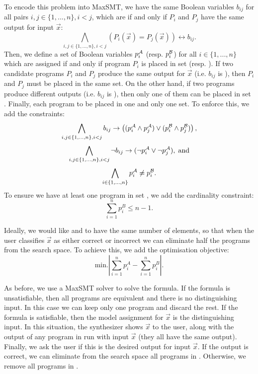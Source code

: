 To encode this problem into \ac{MaxSMT}, we have the same Boolean variables \(b_{ij}\) for all pairs \(i,j \in \{1, ..., n\}, i < j\), which are \true if and only if \(P_i\) and \(P_j\) have the same output for input \(\vec{x}\):
\begin{equation}
    \bigwedge_{i,j \in \{1, ..., n\}, i < j} (P_i(\vec{x}) = P_j(\vec{x})) \leftrightarrow b_{ij}.
\end{equation}
%
Then, we define a set of Boolean variables \(p_i^{\mathcal{A}}\) (resp. \(p_i^{\mathcal{B}}\)) for all \(i\in \{1, ..., n\}\) which are assigned \true if and only if program \(P_i\) is placed in set  (resp. ).
%
If two candidate programs \(P_i\) and \(P_j\) produce the same output for \(\vec{x}\) (i.e. \(b_{ij}\) is \true), then \(P_i\) and \(P_j\) must be placed in the same set. On the other hand, if two programs produce different outputs (i.e. \(b_{ij}\) is \false), then only one of them can be placed in set . Finally, each program to be placed in one and only one set. To enforce this, we add the constraints:
\begin{equation}
    \bigwedge_{i,j \in \{1, ..., n\}, i < j} b_{ij} \rightarrow \left( (p_i^{\mathcal{A}} \wedge p_j^{\mathcal{A}}) \vee (p_i^{\mathcal{B}} \wedge p_j^{\mathcal{B}}) \right),
\end{equation}
%
\begin{equation}
    \bigwedge_{i,j \in \{1, ..., n\}, i < j} \neg b_{ij} \rightarrow (\neg p_i^{\mathcal{A}} \vee \neg p_j^{\mathcal{A}}), \; \textrm{and}
\end{equation}
%
\begin{equation}
    \bigwedge_{i \in \{1, ..., n\}} p_i^{\mathcal{A}} \ne p_i^{\mathcal{B}}.
\end{equation}
%
To ensure we have at least one program in set , we add the cardinality constraint:
\begin{equation}
    \sum_{i=1}^n p_i^B  \le n-1.
\end{equation}

\noindent
Ideally, we would like  and  to have the same number of elements, so that when the user classifies \(\vec{x}\) as either correct or incorrect we can eliminate half the programs from the search space. To achieve this, we add the optimisation objective:
\begin{equation}
    \textrm{min.} \left|\sum_{i=1}^n p_i^A - \sum_{i=1}^n p_i^B \right|.
\end{equation}

As before, we use a \ac{MaxSMT} solver to solve the formula.
If the formula is unsatisfiable, then all programs are equivalent and there is no distinguishing input. In this case we can keep only one program and discard the rest.
If the formula is satisfiable, then the model assignment for \(\vec{x}\) is the distinguishing input. In this situation, the synthesizer shows \(\vec{x}\) to the user, along with the output of any program in  run with input \(\vec{x}\) (they all have the same output).
Finally, we ask the user if this is the desired output for input \(\vec{x}\). If the output is correct, we can eliminate from the search space all programs in . Otherwise, we remove all programs in .

